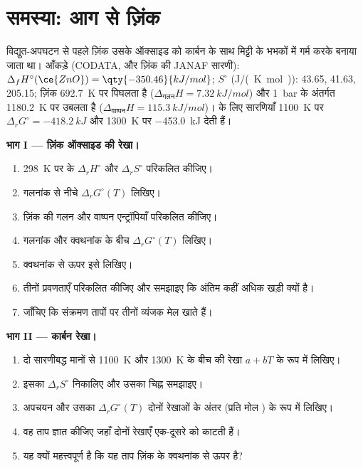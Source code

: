 \section{समस्या: आग से ज़िंक}

\begin{problem}
\label{pb:b2:ellingham:1}
विद्युत-अपघटन से पहले ज़िंक उसके ऑक्साइड को कार्बन के साथ मिट्टी के भभकों में
गर्म करके बनाया जाता था। आँकड़े (CODATA, और ज़िंक की JANAF सारणी): $\Delta_f H^\circ(\ce{ZnO})
= \qty{-350.46}{kJ/mol}$; $S^\circ$ (\unit{J/(K.mol)}):  43.65, 
41.63,  205.15; ज़िंक \qty{692.7}{K} पर पिघलता है ($\Delta_{\text{गलन}}H =
\qty{7.32}{kJ/mol}$) और \qty{1}{bar} के अंतर्गत \qty{1180.2}{K} पर उबलता है
($\Delta_{\text{वाष्पन}}H = \qty{115.3}{kJ/mol}$)।  के लिए
सारणियाँ \qty{1100}{K} पर $\Delta_r G^\circ = \qty{-418.2}{kJ}$ और
\qty{1300}{K} पर \qty{-453.0}{kJ} देती हैं।

\medskip
\noindent\textbf{भाग I --- ज़िंक ऑक्साइड की रेखा।}
\begin{enumerate}
  \item \qty{298}{K} पर  के $\Delta_r H^\circ$ और $\Delta_r S^\circ$ परिकलित कीजिए।
  \item गलनांक से नीचे $\Delta_r G^\circ(T)$ लिखिए।
  \item ज़िंक की गलन और वाष्पन एन्ट्रॉपियाँ परिकलित कीजिए।
  \item गलनांक और क्वथनांक के बीच $\Delta_r G^\circ(T)$ लिखिए।
  \item क्वथनांक से ऊपर इसे लिखिए।
  \item तीनों प्रवणताएँ परिकलित कीजिए और समझाइए कि अंतिम कहीं अधिक खड़ी क्यों है।
  \item जाँचिए कि संक्रमण तापों पर तीनों व्यंजक मेल खाते हैं।
\end{enumerate}

\medskip
\noindent\textbf{भाग II --- कार्बन रेखा।}
\begin{enumerate}[resume]
  \item दो सारणीबद्ध मानों से \qty{1100}{K} और \qty{1300}{K} के बीच
         की रेखा $a + bT$ के रूप में लिखिए।
  \item इसका $\Delta_r S^\circ$ निकालिए और उसका चिह्न समझाइए।
  \item अपचयन  और उसका $\Delta_r
        G^\circ(T)$ दोनों रेखाओं के अंतर (प्रति मोल ) के रूप में लिखिए।
  \item वह ताप ज्ञात कीजिए जहाँ दोनों रेखाएँ एक-दूसरे को काटती हैं।
  \item यह क्यों महत्त्वपूर्ण है कि यह ताप ज़िंक के क्वथनांक
        से ऊपर है?
\end{enumerate}


\end{problem}

